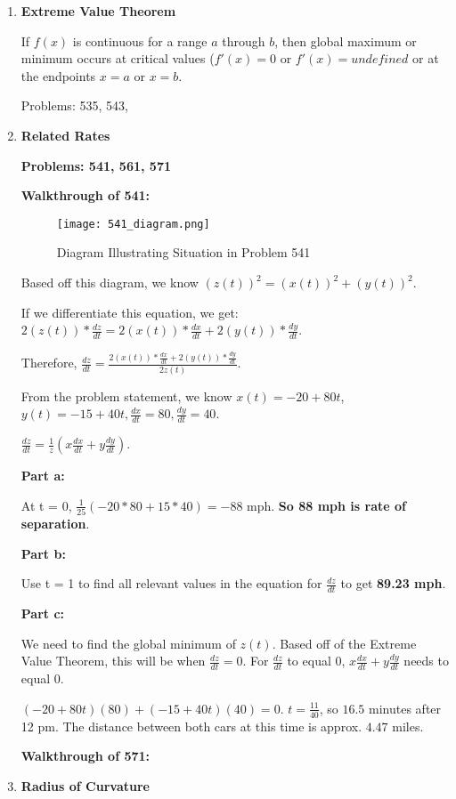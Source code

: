 \documentclass[11pt,twoside]{article}
\begin{document}
\begin{enumerate}
\item \textbf{Extreme Value Theorem}

If $f(x)$ is continuous for a range $a$ through $b$, then global maximum or minimum occurs at critical values ($f'(x) = 0$ or $f'(x) = undefined$ or at the endpoints $x = a$ or $x = b$.

Problems: 535, 543, 

\item \textbf{Related Rates}

\textbf{Problems: 541, 561, 571}

\textbf{Walkthrough of 541:}

\begin{figure}[H]
\centering
\texttt{[image: 541\_diagram.png]}
\caption{Diagram Illustrating Situation in Problem 541}
\end{figure}

Based off this diagram, we know $(z(t))^2 = (x(t))^2 + (y(t))^2$.

If we differentiate this equation, we get: $2(z(t)) * \frac{dz}{dt} = 2(x(t)) * \frac{dx}{dt} + 2(y(t)) * \frac{dy}{dt}$. 

Therefore, $\frac{dz}{dt} = \frac{2(x(t)) * \frac{dx}{dt} + 2(y(t)) * \frac{dy}{dt}}{2z(t)}$.

From the problem statement, we know $x(t) = -20 + 80t$, $y(t) = -15 + 40t, \frac{dx}{dt} = 80, \frac{dy}{dt} = 40$.

$\frac{dz}{dt} = \frac{1}{z}(x\frac{dx}{dt} + y\frac{dy}{dt})$.

\textbf{Part a:}

At t = 0, $\frac{1}{25}(-20 * 80 + 15 * 40) = -88$ mph. \textbf{So 88 mph is rate of separation}.

\textbf{Part b:}

Use t = 1 to find all relevant values in the equation for $\frac{dz}{dt}$ to get \textbf{89.23 mph}.

\textbf{Part c:}

We need to find the global minimum of $z(t)$. Based off of the Extreme Value Theorem, this will be when $\frac{dz}{dt} = 0$. For $\frac{dz}{dt}$ to equal $0$, $x\frac{dx}{dt} + y\frac{dy}{dt}$ needs to equal $0$.

$(-20 + 80t)(80) + (-15 + 40t)(40) = 0$. $t = \frac{11}{40}$, so $16.5$ minutes after 12 pm. The distance between both cars at this time is approx. $4.47$ miles.

\textbf{Walkthrough of 571:} 

\item \textbf{Radius of Curvature} 


\end{enumerate}
\end{document}

